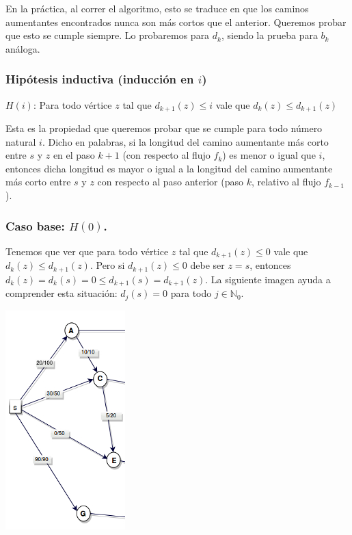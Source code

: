 \documentclass[10pt,a4paper]{article}
\begin{document}
En la práctica, al correr el algoritmo, esto se traduce en que los caminos aumentantes encontrados nunca son más cortos que el anterior. Queremos probar que esto se cumple siempre. Lo probaremos para $d_k$, siendo la prueba para $b_k$ análoga.

\subsubsection*{Hipótesis inductiva (inducción en $i$)}

$H(i)$: Para todo vértice $z$ tal que $d_{k+1}(z) \leq i$ vale que $d_k(z) \leq d_{k+1}(z)$

Esta es la propiedad que queremos probar que se cumple para todo número natural $i$. Dicho en palabras, si la longitud del camino aumentante más corto entre $s$ y $z$ en el paso $k+1$ (con respecto al flujo $f_k$) es menor o igual que $i$, entonces dicha longitud es mayor o igual a la longitud del camino aumentante más corto entre $s$ y $z$ con respecto al paso anterior (paso $k$, relativo al flujo $f_{k-1}$).

\subsubsection*{Caso base: $H(0)$.}

Tenemos que ver que para todo vértice $z$ tal que $d_{k+1}(z) \leq 0$ vale que $d_k(z) \leq d_{k+1}(z)$. Pero si $d_{k+1}(z) \leq 0$ debe ser $z=s$, entonces $d_k(z) = d_k(s) = 0 \leq d_{k+1}(s) = d_{k+1}(z)$. La siguiente imagen ayuda a comprender esta situación: $d_j(s) = 0 $ para todo $j \in \mathbb{N}_0$.

\begin{center}

    \begin{adjustbox}{max size={\textwidth}{\textheight}}
        \includegraphics{definitions/prueba_EK1.jpg}
        \end{adjustbox}
    
\end{center}
\end{document}
